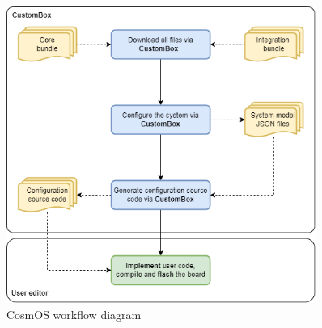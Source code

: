 \begin{figure}[H]
\begin{center}
\includegraphics[width=0.9\textwidth]{images/workflow.png}
\caption{CosmOS workflow diagram}
\label{fig:workflow}
\end{center}
\end{figure}
